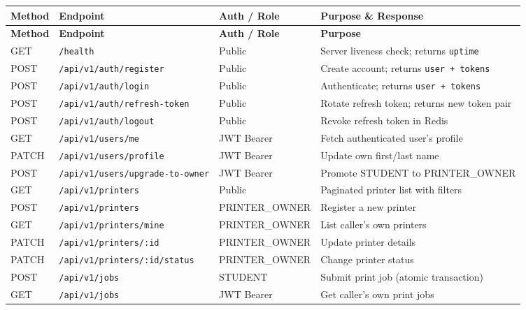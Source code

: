 \documentclass[12pt,a4paper]{report}
\begin{document}
\begin{longtable}{C{1.4cm} L{4.8cm} L{3cm} L{4.2cm}}
  \toprule
  \textbf{Method} & \textbf{Endpoint} & \textbf{Auth / Role} & \textbf{Purpose \& Response} \\
  \midrule
  \endfirsthead
  \midrule
  \textbf{Method} & \textbf{Endpoint} & \textbf{Auth / Role} & \textbf{Purpose} \\
  \midrule
  \endhead
  \bottomrule
  \endfoot
  GET  & \texttt{/health}                             & Public     & Server liveness check; returns \texttt{uptime} \\
  POST & \texttt{/api/v1/auth/register}               & Public     & Create account; returns \texttt{user + tokens} \\
  POST & \texttt{/api/v1/auth/login}                  & Public     & Authenticate; returns \texttt{user + tokens} \\
  POST & \texttt{/api/v1/auth/refresh-token}          & Public     & Rotate refresh token; returns new token pair \\
  POST & \texttt{/api/v1/auth/logout}                 & Public     & Revoke refresh token in Redis \\
  GET  & \texttt{/api/v1/users/me}                    & JWT Bearer & Fetch authenticated user's profile \\
  PATCH & \texttt{/api/v1/users/profile}              & JWT Bearer & Update own first/last name \\
  POST & \texttt{/api/v1/users/upgrade-to-owner}      & JWT Bearer & Promote STUDENT to PRINTER\_OWNER \\
  GET  & \texttt{/api/v1/printers}                    & Public     & Paginated printer list with filters \\
  POST & \texttt{/api/v1/printers}                    & PRINTER\_OWNER & Register a new printer \\
  GET  & \texttt{/api/v1/printers/mine}               & PRINTER\_OWNER & List caller's own printers \\
  PATCH & \texttt{/api/v1/printers/:id}               & PRINTER\_OWNER & Update printer details \\
  PATCH & \texttt{/api/v1/printers/:id/status}        & PRINTER\_OWNER & Change printer status \\
  POST & \texttt{/api/v1/jobs}                        & STUDENT    & Submit print job (atomic transaction) \\
  GET  & \texttt{/api/v1/jobs}                        & JWT Bearer & Get caller's own print jobs \\

\end{longtable}
\end{document}
